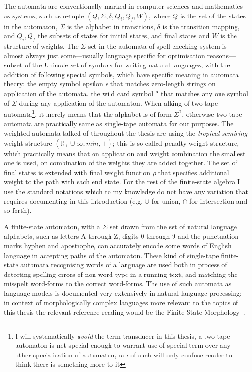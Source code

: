 \documentclass[officiallayout]{unihelcompling}
\begin{document}
The automata are conventionally marked in computer sciences and mathematics as
systems, such as n-tuple $(Q, \Sigma, \delta, Q_i, Q_f, W)$, where $Q$ is the
set of the states in the automaton, $\Sigma$ is the alphabet in transitions,
$\delta$ is the transition mapping, and $Q_i, Q_f$ the subsets of states for
initial states, and final states and $W$ is the structure of weights. The
$\Sigma$ set in the automata of spell-checking system is almost always just
some---usually language specific for optimisation reasons---subset of the
Unicode set of symbols for writing natural languages, with the addition of
following special symbols, which have specific meaning in automata theory: the
empty symbol epsilon $\epsilon$ that matches zero-length strings on application
of the automata, the wild card symbol $?$ that matches any one symbol of
$\Sigma$ during any application of the automaton.  When alking of two-tape
automata\footnote{I will systematically \emph{avoid} the term transducer in
this thesis, a two-tape automaton is not special enough to warrant use of
special term over any other specialisation of automaton, use of such will only
confuse reader to think there is something more to it}, it merely means that
the alphabet is of form $\Sigma^2$, otherwise two-tape automata are practically
same as single-tape automata for our purposes. The weighted automata talked of
throughout the thesis are using the \emph{tropical semiring} weight structure
$(\mathbb{R}_+ \cup \infty, min, +)$; this is so-called penalty weight
structure, which practically means that on application and weight combination
the smallest one is used, on combination of the weights they are added
together. The set of final states is extended with final weight function $\rho$
that specifies additional weight to the path with each end state. For the rest
of the finite-state algebra I use the standard notations which to my knowledge
do not have any variation that requires documenting in this introduction (e.g.
$\cup$ for union, $\cap$ for intersection and so forth).

A finite-state automaton, with a $\Sigma$ set drawn from the set of natural
language alphabets, such as letters A through Z, digits 0 through 9 and the
punctuation marks hyphen and apostrophe, can accurately encode some words of
English language in accepting paths of the automaton. These kind of single-tape
finite-state automata recognising words of a language are used both in process
of detecting spelling errors of non-word type in a running text, and matching
the misspelt word-forms to the correct word-forms. The use of such automata as
language models is documented very extensively in natural language processing;
in context of morphologically complex languages more relevant to the topics of
this thesis the relevant reference reading would be the Finite-State Morphology~\citep{beesley2003finite,beesley2004morphological}.
\end{document}
